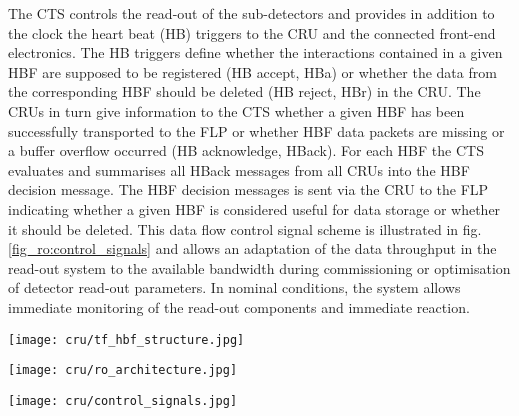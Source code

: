 The CTS controls the read-out of the sub-detectors and provides in addition to the clock the heart beat (HB) triggers to the CRU and the connected front-end electronics. The HB triggers define whether the interactions contained in a given HBF are supposed to be registered (HB accept, HBa) or whether the data from the corresponding HBF should be deleted (HB reject, HBr) in the CRU. The CRUs in turn give information to the CTS whether a given HBF has been successfully transported to the FLP or whether HBF data packets are missing or a buffer overflow occurred (HB acknowledge, HBack). 
For each HBF the CTS evaluates and summarises all HBack messages from all CRUs into the  HBF decision message. The HBF decision messages is sent via the CRU to the FLP indicating whether a given HBF is considered useful for data storage or whether it should be deleted. This data flow control signal scheme is illustrated in fig. \ref{fig_ro:control_signals} and allows an adaptation of the data throughput in the read-out system to the available bandwidth during commissioning or optimisation of detector read-out parameters. In nominal conditions, the system allows immediate monitoring of the read-out components and immediate reaction.

\begin{figure*}[hbtp]
  \begin{center}
    \texttt{[image: cru/tf\_hbf\_structure.jpg]}
  \end{center}
  \caption{TF and HBF structure: additional info will be added here@}
  \label{fig_ro:tf_hbf_structure}
\end{figure*}

\begin{figure*}[hbtp]
  \begin{center}
    \texttt{[image: cru/ro\_architecture.jpg]}
  \end{center}
  \caption{ALICE read-out architecture: additional info will be added here@, add FLP and EPN farm}
  \label{fig_ro:ro_architecture}
\end{figure*}

\begin{figure*}[hbtp]
  \begin{center}
    \texttt{[image: cru/control\_signals.jpg]}
  \end{center}
  \caption{ALICE Control signals: additional info will be added here@ or the figure will be removed}
  \label{fig_ro:control_signals}
\end{figure*}




